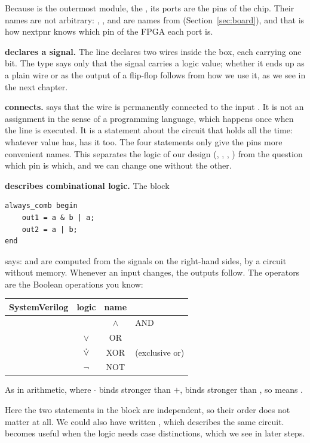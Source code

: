 Because  is the outermost module, the , its ports
are the pins of the chip. Their names are not arbitrary: , ,
 and  are names from 
(Section~\ref{sec:board}), and that is how nextpnr knows which pin of the FPGA
each port is.

\textbf{ declares a signal.} The line  declares two
wires inside the box, each carrying one bit. The type  says only
that the signal carries a logic value; whether it ends up as a plain wire or as
the output of a flip-flop follows from how we use it, as we see in the next
chapter.

\textbf{ connects.}  says that the wire
 is permanently connected to the input . It is not an
assignment in the sense of a programming language, which happens once when the
line is executed. It is a statement about the circuit that holds all the time:
whatever value  has,  has it too. The four 
statements only give the pins more convenient names. This separates the logic
of our design (, , , ) from the question which
pin is which, and we can change one without the other.

\textbf{ describes combinational logic.} The block
\begin{lstlisting}
always_comb begin
    out1 = a & b | a;
    out2 = a | b;
end
\end{lstlisting}
says:  and  are computed from the signals on the right-hand
sides, by a circuit without memory. Whenever an input changes, the outputs
follow. The operators are the Boolean operations you know:
\begin{center}
\begin{tabular}{cccl}
\toprule
SystemVerilog & logic & name & \\
\midrule
\cc{&} & $\wedge$ & AND & \\
\cc{|} & $\vee$ & OR & \\
\cc{^} & $\mathbin{\dot{\lor}}$ & XOR & (exclusive or) \\
\cc{~} & $\neg$ & NOT & \\
\bottomrule
\end{tabular}
\end{center}
As in arithmetic, where $\cdot$ binds stronger than $+$, \cc{&} binds stronger
than \cc{|}, so  means .

Here the two statements in the block are independent, so their order does not
matter at all. We could also have written , which
describes the same circuit.  becomes useful when the logic
needs case distinctions, which we see in later steps.

